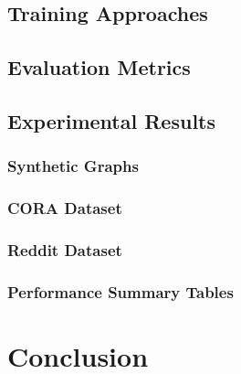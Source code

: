 \documentclass{article}
\begin{document}
\subsection{Training Approaches}

\subsection{Evaluation Metrics}

\subsection{Experimental Results}
\subsubsection{Synthetic Graphs}

\subsubsection{CORA Dataset}

\subsubsection{Reddit Dataset}








\subsubsection{Performance Summary Tables}




\section{Conclusion}



\end{document}
